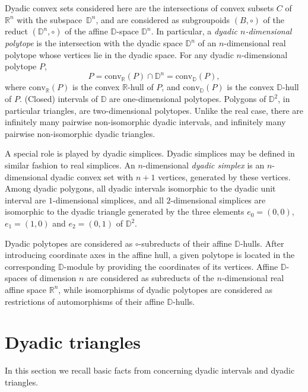 \documentclass[12pt]{amsart}
\def\mr{\mathrm}
\def\mbR{\mathbb{R}}
\def\mbD{\mathbb{D}}
\theoremstyle{plain}
\theoremstyle{definition}
\numberwithin{equation}{section}
\begin{document}
Dyadic convex sets considered here are the intersections of convex subsets $C$ of $\mbR^n$  with the subspace~$\mbD^n$, and are considered as subgroupoids $(B, \circ)$ of the reduct $(\mbD^n, \circ)$ of the affine $\mbD$-space $\mbD^n$.
In particular, a \emph{dyadic $n$-dimensional polytope} is the intersection with the dyadic space $\mbD^n$ of an $n$-dimensional real polytope whose vertices lie in the dyadic space.
For any dyadic $n$-dimensional polytope $P$,
\begin{equation}\label{E:pol}
P = \mr{conv}_{\mbR}(P) \cap \mbD^n = \mr{conv}_{\mbD}(P),
\end{equation}
where $\mr{conv}_{\mbR}(P)$ is the convex $\mbR$-hull of $P$, and $\mr{conv}_{\mbD}(P)$ is  the convex $\mbD$-hull of $P$. (Closed) intervals of $\mbD$ are one-dimensional polytopes.
Polygons of $\mbD^2$, in particular triangles, are two-dimensional polytopes.
Unlike the real case, there are infinitely many pairwise non-isomorphic dyadic intervals, and infinitely many pairwise non-isomorphic dyadic triangles.

A special role is played by dyadic simplices. Dyadic simplices may be defined in similar fashion to real simplices. An $n$-dimensional \emph{dyadic simplex} is an $n$-dimensional dyadic convex set with $n+1$ vertices, generated by these vertices. Among dyadic polygons, all dyadic intervals isomorphic to the dyadic unit interval are $1$-dimensional simplices, and all $2$-dimensional simplices are isomorphic to the dyadic triangle generated by the three elements $e_0 = (0,0)$, $e_1 = (1,0)$ and $e_2 = (0,1)$ of $\mbD^2$.

Dyadic polytopes are considered as  $\circ$-subreducts  of their affine $\mbD$-hulls. After introducing coordinate axes in the affine hull, a given polytope is located in the corresponding $\mbD$-module by providing the coordinates of its vertices. Affine $\mbD$-spaces of dimension $n$ are considered as subreducts of the $n$-dimensional real affine space $\mbR^n$, while isomorphisms of dyadic polytopes are considered as restrictions of automorphisms of their affine $\mbD$-hulls.



\section{Dyadic triangles}\label{S:Triangles}


In this section we recall basic facts from \cite{MR25} concerning dyadic intervals and dyadic triangles.
\end{document}
